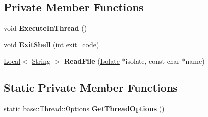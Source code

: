 \subsection*{Private Member Functions}
\begin{DoxyCompactItemize}
\item 
void {\bfseries Execute\+In\+Thread} ()\hypertarget{classv8_1_1_source_group_ace4ff2f9f504224fbb16a8a3dd261e79}{}\label{classv8_1_1_source_group_ace4ff2f9f504224fbb16a8a3dd261e79}

\item 
void {\bfseries Exit\+Shell} (int exit\+\_\+code)\hypertarget{classv8_1_1_source_group_a414ef7bd2a1539c2f6e621d5ee1e200e}{}\label{classv8_1_1_source_group_a414ef7bd2a1539c2f6e621d5ee1e200e}

\item 
\hyperlink{classv8_1_1_local}{Local}$<$ \hyperlink{classv8_1_1_string}{String} $>$ {\bfseries Read\+File} (\hyperlink{classv8_1_1_isolate}{Isolate} $\ast$isolate, const char $\ast$name)\hypertarget{classv8_1_1_source_group_a5f526847b75fdca4e3fc1c7fdcc346fe}{}\label{classv8_1_1_source_group_a5f526847b75fdca4e3fc1c7fdcc346fe}

\end{DoxyCompactItemize}
\subsection*{Static Private Member Functions}
\begin{DoxyCompactItemize}
\item 
static \hyperlink{classv8_1_1base_1_1_thread_1_1_options}{base\+::\+Thread\+::\+Options} {\bfseries Get\+Thread\+Options} ()\hypertarget{classv8_1_1_source_group_a394cb7678e63273482a5623a8440aac0}{}\label{classv8_1_1_source_group_a394cb7678e63273482a5623a8440aac0}

\end{DoxyCompactItemize}
